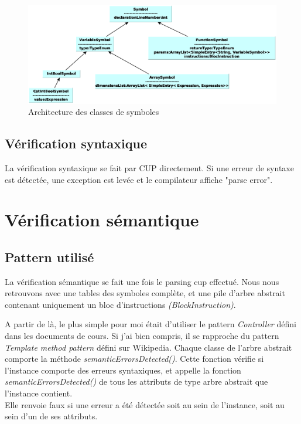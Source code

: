 \documentclass[11pt,a4paper]{article}
\begin{document}
   \begin{figure}[h]
    \includegraphics[width=1\textwidth,center]{../ressources/classesDesSymboles.eps}
        \caption{Architecture des classes de symboles}
   \end{figure}
   
   \subsection{Vérification syntaxique}
   
   \par La vérification syntaxique se fait par CUP directement. Si une erreur de syntaxe est détectée, une exception est levée et le compilateur affiche "parse error".   
   
   
  \section{Vérification sémantique}

  \subsection{Pattern utilisé}
  
  \par La vérification sémantique se fait une fois le parsing cup effectué. Nous nous retrouvons avec une tables des symboles complète, et une pile d'arbre abstrait contenant uniquement un bloc d'instructions \textit{(BlockInstruction)}. 
  
  \par A partir de là, le plus simple pour moi était d'utiliser le pattern \textit{Controller} défini dans les documents de cours. Si j'ai bien compris, il se rapproche du pattern \textit{Template method pattern} défini sur Wikipedia. Chaque classe de l'arbre abstrait comporte la méthode \textit{semanticErrorsDetected()}. Cette fonction vérifie si l'instance comporte des erreurs syntaxiques, et appelle la fonction  \textit{semanticErrorsDetected()} de tous les attributs de type arbre abstrait que l'instance contient. \\
  Elle renvoie faux si une erreur a été détectée soit au sein de l'instance, soit au sein d'un de ses attributs. 
\end{document}
